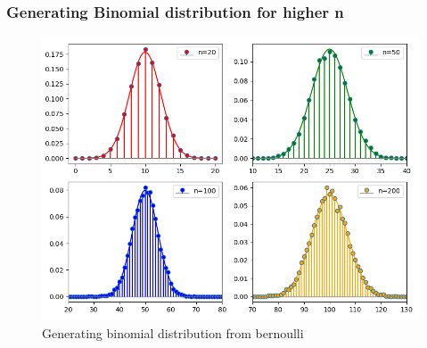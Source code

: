 \documentclass{beamer}
\theoremstyle{remark}
\numberwithin{equation}{section}
\begin{document}
\begin{frame}
  \frametitle{Generating Binomial distribution for higher n}
\begin{figure}[h!]
   \centering
   \includegraphics[width=0.7\columnwidth]{figs/binomial.png}
    \caption{Generating binomial distribution from bernoulli}
\end{figure}
\end{frame}
\end{document}
